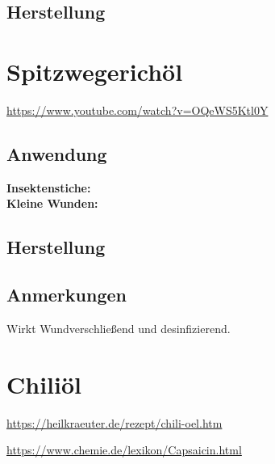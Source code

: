 \subsection{Herstellung}




\newpage




\section{Spitzwegerichöl}


\cite{swrhandwerkskunst} 

\url{https://www.youtube.com/watch?v=OQeWS5Ktl0Y}

 

\subsection{Anwendung}
\textbf{Insektenstiche:} \\ 

\textbf{Kleine Wunden:} \\

\subsection{Herstellung}
\subsection{Anmerkungen}

Wirkt Wundverschließend und desinfizierend.




\newpage



\section{Chiliöl}


\url{https://heilkraeuter.de/rezept/chili-oel.htm}

\url{https://www.chemie.de/lexikon/Capsaicin.html}

